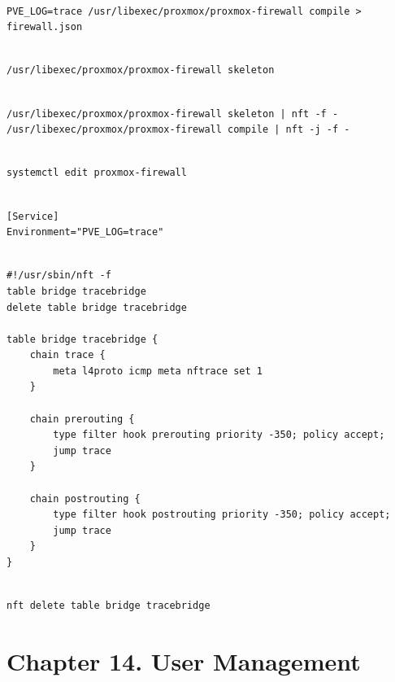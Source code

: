 \begin{lstlisting}

PVE_LOG=trace /usr/libexec/proxmox/proxmox-firewall compile > firewall.json

\end{lstlisting}

\begin{lstlisting}

/usr/libexec/proxmox/proxmox-firewall skeleton

\end{lstlisting}

\begin{lstlisting}

/usr/libexec/proxmox/proxmox-firewall skeleton | nft -f -
/usr/libexec/proxmox/proxmox-firewall compile | nft -j -f -

\end{lstlisting}

\begin{lstlisting}

systemctl edit proxmox-firewall

\end{lstlisting}

\begin{lstlisting}

[Service]
Environment="PVE_LOG=trace"

\end{lstlisting}

\begin{lstlisting}

#!/usr/sbin/nft -f
table bridge tracebridge
delete table bridge tracebridge

table bridge tracebridge {
    chain trace {
        meta l4proto icmp meta nftrace set 1
    }

    chain prerouting {
        type filter hook prerouting priority -350; policy accept;
        jump trace
    }

    chain postrouting {
        type filter hook postrouting priority -350; policy accept;
        jump trace
    }
}

\end{lstlisting}

\begin{lstlisting}

nft delete table bridge tracebridge

\end{lstlisting}


\section{Chapter 14. User Management}

